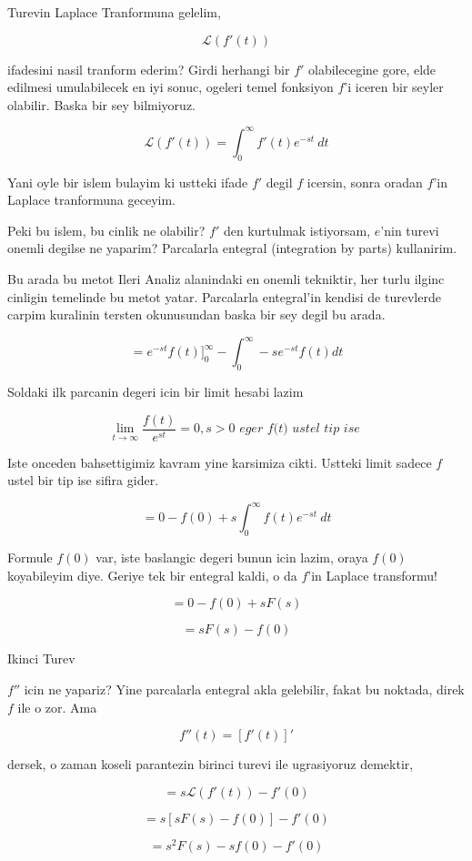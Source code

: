 \documentclass[12pt,fleqn]{article}
\begin{document}
Turevin Laplace Tranformuna gelelim,

\[ \mathcal{L}(f'(t)) \]

ifadesini nasil tranform ederim? Girdi herhangi bir $f'$ olabilecegine
gore, elde edilmesi umulabilecek en iyi sonuc, ogeleri temel fonksiyon
$f$'i iceren bir seyler olabilir. Baska bir sey bilmiyoruz. 

\[ \mathcal{L}(f'(t)) = \int_0^{\infty} f'(t)e^{-st} \ dt \]

Yani oyle bir islem bulayim ki ustteki ifade $f'$ degil $f$ icersin, sonra
oradan $f$'in Laplace tranformuna geceyim. 

Peki bu islem, bu cinlik ne olabilir? $f'$ den kurtulmak istiyorsam,
$e$'nin turevi onemli degilse ne yaparim? Parcalarla entegral (integration
by parts) kullanirim. 

Bu arada bu metot Ileri Analiz alanindaki en onemli tekniktir, her turlu
ilginc cinligin temelinde bu metot yatar. Parcalarla entegral'in kendisi de
turevlerde carpim kuralinin tersten okunusundan baska bir sey degil bu arada.

\[ = e^{-st}f(t) \bigg]_{0}^{\infty}  - 
\int_{0}^{\infty} -s e^{-st}f(t)dt
 \]

Soldaki ilk parcanin degeri icin bir limit hesabi lazim

\[ \lim_{t \to \infty} \frac{f(t)}{e^{st}} = 0 
, s>0
\textit{ eger f(t) ustel tip ise }
\]

Iste onceden bahsettigimiz kavram yine karsimiza cikti. Ustteki limit
sadece $f$ ustel bir tip ise sifira gider. 

\[=  0 - f(0) + s \int_0^{\infty} f(t)e^{-st} \ dt
 \]

Formule $f(0)$ var, iste baslangic degeri bunun icin lazim, oraya $f(0)$
koyabileyim diye. Geriye tek bir entegral kaldi, o da $f$'in Laplace
transformu! 

\[=  0 - f(0) + s F(s) \]

\[=  s F(s) - f(0) \]

Ikinci Turev

$f''$ icin ne yapariz? Yine parcalarla entegral akla gelebilir, fakat bu
noktada, direk $f$ ile o zor. Ama 

\[ f''(t) = [f'(t)]' \]

dersek, o zaman koseli parantezin birinci turevi ile ugrasiyoruz demektir,

\[ = s \mathcal{L} (f'(t)) - f'(0)\]

\[ =  s[sF(s) -f(0)] - f'(0)\]

\[ =  s^2F(s) - sf(0) - f'(0)\]
\end{document}
